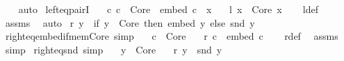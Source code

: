 \begin{isabellebody}
%
\isadelimproof
\ \ %
\endisadelimproof
%
\isatagproof
{}\isamarkupfalse%
\ auto%
\endisatagproof
{\isafoldproof}%
%
\isadelimproof
\isanewline
%
\endisadelimproof
\isanewline
{}\isamarkupfalse%
\ left{\isacharunderscore}{\kern0pt}eq{\isacharunderscore}{\kern0pt}pairI{\isacharcolon}{\kern0pt}\isanewline
\ \ \ {\isachardoublequoteopen}{\isasymAnd}c{\isachardot}{\kern0pt}\ c\ {\isasymin}\ Core\ {\isasymLongrightarrow}\ embed\ c\ {\isasymnoteq}\ x{\isachardoublequoteclose}\isanewline
\ \ \ {\isachardoublequoteopen}l\ x\ {\isacharequal}{\kern0pt}\ {\isasymlangle}Core{\isacharcomma}{\kern0pt}\ x{\isasymrangle}{\isachardoublequoteclose}\isanewline
%
\isadelimproof
\ \ %
\endisadelimproof
%
\isatagproof
{}\isamarkupfalse%
\ l{\isacharunderscore}{\kern0pt}def\ \isamarkupfalse%
\ assms\ \isamarkupfalse%
\ auto%
\endisatagproof
{\isafoldproof}%
%
\isadelimproof
\isanewline
%
\endisadelimproof
\isanewline
{}\isamarkupfalse%
\ {\isachardoublequoteopen}r\ y\ {\isasymequiv}\ if\ y\ {\isasymin}\ Core\ then\ embed\ y\ else\ snd\ y{\isachardoublequoteclose}\isanewline
\isanewline
{}\isamarkupfalse%
\ right{\isacharunderscore}{\kern0pt}eq{\isacharunderscore}{\kern0pt}embed{\isacharunderscore}{\kern0pt}if{\isacharunderscore}{\kern0pt}mem{\isacharunderscore}{\kern0pt}Core\ {\isacharbrackleft}{\kern0pt}simp{\isacharbrackright}{\kern0pt}{\isacharcolon}{\kern0pt}\isanewline
\ \ \ {\isachardoublequoteopen}c\ {\isasymin}\ Core{\isachardoublequoteclose}\isanewline
\ \ \ {\isachardoublequoteopen}r\ c\ {\isacharequal}{\kern0pt}\ embed\ c{\isachardoublequoteclose}\isanewline
%
\isadelimproof
\ \ %
\endisadelimproof
%
\isatagproof
{}\isamarkupfalse%
\ r{\isacharunderscore}{\kern0pt}def\ \isamarkupfalse%
\ assms\ \isamarkupfalse%
\ simp%
\endisatagproof
{\isafoldproof}%
%
\isadelimproof
\isanewline
%
\endisadelimproof
\isanewline
{}\isamarkupfalse%
\ right{\isacharunderscore}{\kern0pt}eq{\isacharunderscore}{\kern0pt}snd\ {\isacharbrackleft}{\kern0pt}simp{\isacharbrackright}{\kern0pt}{\isacharcolon}{\kern0pt}\isanewline
\ \ \ {\isachardoublequoteopen}y\ {\isasymnotin}\ Core{\isachardoublequoteclose}\isanewline
\ \ \ {\isachardoublequoteopen}r\ y\ {\isacharequal}{\kern0pt}\ snd\ y{\isachardoublequoteclose}\isanewline
%
\isadelimproof
\ \ %
\endisadelimproof
%
\isatagproof
{}\isamarkupfalse%

\end{isabellebody}
